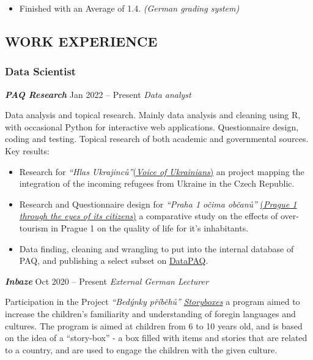\documentclass[
  letterpaper,
  DIV=11,
  numbers=noendperiod]{scrartcl}
\providecommand{\tightlist}{%
  \setlength{\itemsep}{0pt}\setlength{\parskip}{0pt}}\usepackage{longtable,booktabs,array}
\begin{document}
\begin{itemize}
\tightlist
\item
  Finished with an Average of 1.4. \emph{(German grading system)}
\end{itemize}

\hypertarget{work-experience}{%
\subsection{WORK EXPERIENCE}\label{work-experience}}

\hypertarget{data-scientist}{%
\subsubsection{Data Scientist}\label{data-scientist}}

\textbf{\emph{PAQ Research}} {Jan 2022 -- Present} \emph{Data analyst}

Data analysis and topical research. Mainly data analysis and cleaning
using R, with occasional Python for interactive web applications.
Questionnaire design, coding and testing. Topical research of both
academic and governmental sources. Key results:

\begin{itemize}
\tightlist
\item
  Research for \emph{``Hlas
  Ukrajinců''}\href{https://www.paqresearch.cz/post/voice-of-ukrainians-education-housing-employment-poverty-mental-health/}{(\emph{Voice
  of Ukrainians})} an project mapping the integration of the incoming
  refugees from Ukraine in the Czech Republic.
\item
  Research and Questionnaire design for \emph{``Praha 1 očima občanů''}
  \href{https://www.paqresearch.cz/post/praha1/}{(\emph{Prague 1 through
  the eyes of its citizens})} a comparative study on the effects of
  over-tourism in Prague 1 on the quality of life for it's inhabitants.
\item
  Data finding, cleaning and wrangling to put into the internal database
  of PAQ, and publishing a select subset on
  \href{https://www.datapaq.cz/}{DataPAQ}.
\end{itemize}

\textbf{\emph{Inbaze}} {Oct 2020 -- Present} \emph{External German
Lecturer}

Participation in the Project \emph{``Bedýnky příběhů''}
\href{https://inbaze.cz/produkt/bedynka-pribehu-z-nemecka/}{\emph{Storyboxes}}
a program aimed to increase the children's familiarity and understanding
of foregin languages and cultures. The program is aimed at children from
6 to 10 years old, and is based on the idea of a ``story-box'' - a box
filled with items and stories that are related to a country, and are
used to engage the children with the given culture.
\end{document}
